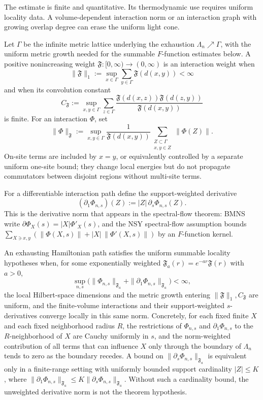 The estimate is finite and quantitative.  Its thermodynamic use requires
uniform locality data.  A volume-dependent interaction norm or an interaction
graph with growing overlap degree can erase the uniform light cone.

\begin{definition}
\label{def:uniform-summable-interaction-hypotheses}
Let \(\Gamma\) be the infinite metric lattice underlying the exhaustion
\(\Lambda_n\nearrow\Gamma\), with the uniform metric growth needed for the
summable \(F\)-function estimates below.  A positive nonincreasing weight
\(\mathfrak F:[0,\infty)\to(0,\infty)\) is an interaction weight when
\[
  \|\mathfrak F\|_1
  :=
  \sup_{x\in\Gamma}\sum_{y\in\Gamma}\mathfrak F(d(x,y))<\infty
\]
and when its convolution constant
\[
  C_{\mathfrak F}
  :=
  \sup_{x,y\in\Gamma}
  \sum_{z\in\Gamma}
  \frac{\mathfrak F(d(x,z))\mathfrak F(d(z,y))}
       {\mathfrak F(d(x,y))}
\]
is finite.  For an interaction \(\Phi\), set
\[
  \|\Phi\|_{\mathfrak F}
  :=
  \sup_{x,y\in\Gamma}
  \frac{1}{\mathfrak F(d(x,y))}
  \sum_{\substack{Z\subset\Gamma\\ x,y\in Z}}\|\Phi(Z)\|.
\]
On-site terms are included by \(x=y\), or equivalently controlled by a separate
uniform one-site bound; they change local energies but do not propagate
commutators between disjoint regions without multi-site terms.

For a differentiable interaction path define the support-weighted derivative
\[
  (\partial_1\Phi_{n,s})(Z)
  :=
  |Z|\,\partial_s\Phi_{n,s}(Z).
\]
This is the derivative norm that appears in the spectral-flow theorem: BMNS
write \(\partial\Phi_X(s)=|X|\Phi'_X(s)\), and the NSY spectral-flow
assumption bounds
\(\sum_{X\ni x,y}(\|\Phi(X,s)\|+|X|\,\|\Phi'(X,s)\|)\) by an \(F\)-function
kernel.

An exhausting Hamiltonian path satisfies the uniform summable locality
hypotheses when, for some exponentially weighted
\(\mathfrak F_a(r)=e^{-ar}\mathfrak F(r)\) with \(a>0\),
\[
  \sup_{n,s}
  \bigl(
    \|\Phi_{n,s}\|_{\mathfrak F_a}
    +
    \|\partial_1\Phi_{n,s}\|_{\mathfrak F_a}
  \bigr)<\infty,
\]
the local Hilbert-space dimensions and the metric growth entering
\(\|\mathfrak F\|_1,C_{\mathfrak F}\) are uniform, and the finite-volume
interactions and their support-weighted \(s\)-derivatives converge locally in
this same norm.  Concretely, for each fixed finite \(X\) and each fixed
neighborhood radius \(R\), the restrictions of
\(\Phi_{n,s}\) and \(\partial_1\Phi_{n,s}\) to the \(R\)-neighborhood of \(X\)
are Cauchy uniformly in \(s\), and the norm-weighted contribution of all
terms that can influence \(X\) only through the boundary of \(\Lambda_n\)
tends to zero as the boundary recedes.  A bound on
\(\|\partial_s\Phi_{n,s}\|_{\mathfrak F_a}\) is equivalent only in a
finite-range setting with uniformly bounded support cardinality
\(|Z|\le K\), where
\(\|\partial_1\Phi_{n,s}\|_{\mathfrak F_a}\le
K\|\partial_s\Phi_{n,s}\|_{\mathfrak F_a}\).  Without such a cardinality
bound, the unweighted derivative norm is not the theorem hypothesis.


\end{definition}

